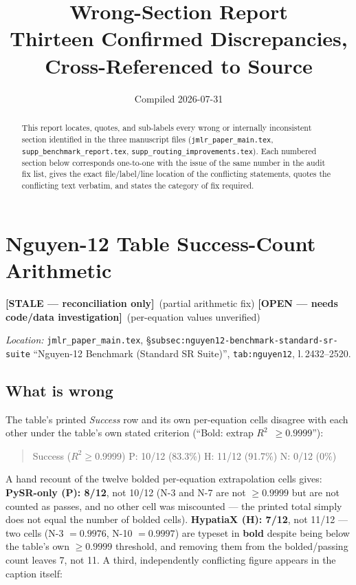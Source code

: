\documentclass[11pt]{article}
\title{\bf Wrong-Section Report\\\large Thirteen Confirmed Discrepancies, Cross-Referenced to Source}
\author{}
\date{Compiled 2026-07-31}
\newcommand{\rtwo}{$R^2$}
\newcommand{\open}{\textcolor{red!60!black}{\textbf{[OPEN --- needs code/data investigation]}}}
\newcommand{\stale}{\textcolor{orange!80!black}{\textbf{[STALE --- reconciliation only]}}}
\newcommand{\loc}[1]{\textit{Location:} #1\par}
\newenvironment{evidence}
  {\begin{quote}\small\ttfamily}
  {\end{quote}}
\begin{document}
\maketitle
\thispagestyle{empty}

\begin{abstract}
This report locates, quotes, and sub-labels every wrong or internally
inconsistent section identified in the three manuscript files
(\texttt{jmlr\_paper\_main.tex}, \texttt{supp\_benchmark\_report.tex},
\texttt{supp\_routing\_improvements.tex}). Each numbered section below
corresponds one-to-one with the issue of the same number in the audit
fix list, gives the exact file/label/line location of the conflicting
statements, quotes the conflicting text verbatim, and states the category
of fix required.
\end{abstract}

\tableofcontents
\clearpage

\section{Nguyen-12 Table Success-Count Arithmetic}
\label{issue:1}
\stale\ (partial arithmetic fix) \open\ (per-equation values unverified)

\loc{\texttt{jmlr\_paper\_main.tex}, \S\texttt{subsec:nguyen12-benchmark-standard-sr-suite}
``Nguyen-12 Benchmark (Standard SR Suite)'', \texttt{tab:nguyen12}, l.\,2432--2520.}

\subsection*{What is wrong}
The table's printed \emph{Success} row and its own per-equation cells
disagree with each other under the table's own stated criterion
(``Bold: extrap \rtwo\ $\geq 0.9999$''):

\begin{evidence}
Success (\rtwo$\ge$0.9999) \quad P: 10/12 (83.3\%) \quad H: 11/12 (91.7\%) \quad N: 0/12 (0\%)
\end{evidence}

A hand recount of the twelve bolded per-equation extrapolation cells gives:
\textbf{PySR-only (P): 8/12}, not 10/12 (N-3 and N-7 are not $\geq0.9999$ but
are not counted as passes, and no other cell was miscounted --- the printed
total simply does not equal the number of bolded cells). \textbf{HypatiaX
(H): 7/12}, not 11/12 --- two cells (N-3 $=0.9976$, N-10 $=0.9997$) are
typeset in \textbf{bold} despite being below the table's own $\geq0.9999$
threshold, and removing them from the bolded/passing count leaves 7, not 11.
A third, independently conflicting figure appears in the caption itself:
\end{document}
